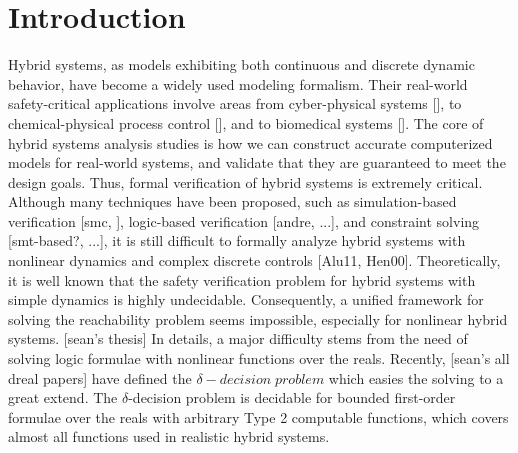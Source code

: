 \documentclass[runningheads,a4paper]{llncs}
\begin{document}
\section{Introduction}
\begin{comment}
- Start with the motivations (application areas needing both nonlinear arithmetic and probabilistic system parameters. (Hybrid systems))\\
- Introduce dReal and drear as the SMT solver and the checker for Hybrid models. (focus on the strength of dReal - sound and relatively complete for nonlinear)\\
- Introduce the statistical model checking, especially different statistical analyzing methods to estimate the probability of a model satisfying a property.
\end{comment}

Hybrid systems, as models exhibiting both continuous and discrete dynamic behavior, have become a widely used modeling formalism. Their real-world safety-critical applications involve areas from cyber-physical systems [], to chemical-physical process control [], and to biomedical systems []. The core of hybrid systems analysis studies is how we can construct accurate computerized models for real-world systems, and validate that they are guaranteed to meet the design goals. Thus, formal verification of hybrid systems is extremely critical. Although many techniques have been proposed, such as simulation-based verification [smc, ], logic-based verification [andre, ...], and constraint solving [smt-based?, ...], it is still difficult to formally analyze hybrid systems with nonlinear dynamics and complex discrete controls [Alu11, Hen00]. Theoretically, it is well known that the safety verification problem for hybrid systems with simple dynamics is highly undecidable. Consequently, a unified framework for solving the reachability problem seems impossible, especially for nonlinear hybrid systems. [sean's thesis] In details, a major difficulty stems from the need of solving logic formulae with nonlinear functions over the reals. Recently, [sean's all dreal papers] have defined the $\delta-decision \;  problem$ which easies the solving to a great extend. The $\delta$-decision problem is decidable for bounded first-order formulae over the reals with arbitrary Type 2 computable functions, which covers almost all functions used in realistic hybrid systems. 
\end{document}
